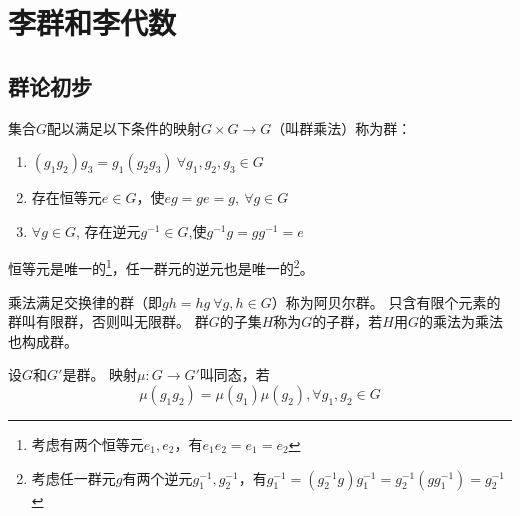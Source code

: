 \chapter{李群和李代数}

\section{群论初步}

\begin{definition}
    集合$G$配以满足以下条件的映射$G \times G \to G$（叫群乘法）称为群：
    \begin{enumerate}[（a）]
        \item $(g_1g_2)g_3 = g_1(g_2g_3) ~ \forall g_1, g_2, g_3 \in G$
        \item 存在恒等元$e \in G$，使$eg = ge = g, ~ \forall g \in G$
        \item $\forall g \in G$, 存在逆元$g^{-1} \in G$,使$g^{-1}g = gg^{-1} = e$
    \end{enumerate}
\end{definition}

\begin{note}
    恒等元是唯一的\footnote{
        考虑有两个恒等元$e_1, e_2$，有$e_1e_2 = e_1 = e_2$
    }，任一群元的逆元也是唯一的\footnote{
        考虑任一群元$g$有两个逆元$g_1^{-1}, g_2^{-1}$，有$g_1^{-1} = (g_2^{-1}g)g_1^{-1} = g_2^{-1}(gg_1^{-1}) = g_2^{-1}$
    }。
\end{note}

\begin{definition}
    乘法满足交换律的群（即$gh = hg ~ \forall g, h \in G$）称为阿贝尔群。
    只含有限个元素的群叫有限群，否则叫无限群。
    群$G$的子集$H$称为$G$的子群，若$H$用$G$的乘法为乘法也构成群。
\end{definition}

\begin{definition}
    设$G$和$G'$是群。
    映射$\mu \colon G \to G'$叫同态，若
    $$\mu(g_1g_2) = \mu(g_1)\mu(g_2), \forall g_1, g_2 \in G$$
\end{definition}


